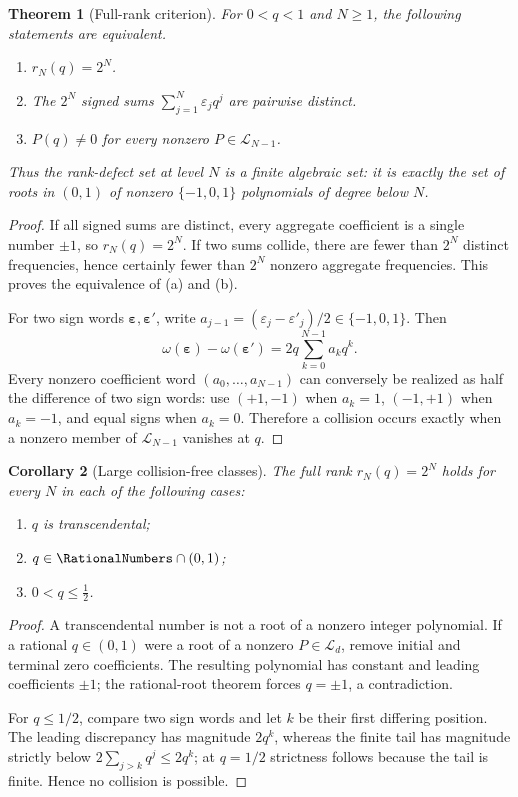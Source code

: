 \documentclass[11pt]{article}
\numberwithin{equation}{section}
\newtheorem{theorem}{Theorem}[section]
\newtheorem{corollary}[theorem]{Corollary}
\theoremstyle{definition}
\theoremstyle{remark}
\newcommand{\eps}{\varepsilon}
\begin{document}
\begin{theorem}[Full-rank criterion]
\label{thm:full-rank-criterion}
For $0<q<1$ and $N\ge1$, the following statements are equivalent.
\begin{enumerate}[label=(\alph*)]
 \item $r_N(q)=2^N$.
 \item The $2^N$ signed sums $\sum_{j=1}^{N}\eps_jq^j$ are pairwise distinct.
 \item $P(q)\ne0$ for every nonzero $P\in\mathscr L_{N-1}$.
\end{enumerate}
Thus the rank-defect set at level $N$ is a finite algebraic set: it is exactly
the set of roots in $(0,1)$ of nonzero $\{-1,0,1\}$ polynomials of degree below
$N$.
\end{theorem}
\begin{proof}
If all signed sums are distinct, every aggregate coefficient is a single number
$\pm1$, so $r_N(q)=2^N$.  If two sums collide, there are fewer than $2^N$
distinct frequencies, hence certainly fewer than $2^N$ nonzero aggregate
frequencies.  This proves the equivalence of (a) and (b).

For two sign words $\bm\eps,\bm\eps'$, write
$a_{j-1}=(\eps_j-\eps'_j)/2\in\{-1,0,1\}$.  Then
\begin{equation}
 \omega(\bm\eps)-\omega(\bm\eps')
 =2q\sum_{k=0}^{N-1}a_kq^k.
 \label{eq:collision-polynomial}
\end{equation}
Every nonzero coefficient word $(a_0,\ldots,a_{N-1})$ can conversely be
realized as half the difference of two sign words: use $(+1,-1)$ when
$a_k=1$, $(-1,+1)$ when $a_k=-1$, and equal signs when $a_k=0$.  Therefore a
collision occurs exactly when a nonzero member of $\mathscr L_{N-1}$ vanishes
at $q$.
\end{proof}

\begin{corollary}[Large collision-free classes]
\label{cor:collision-free-classes}
The full rank $r_N(q)=2^N$ holds for every $N$ in each of the following cases:
\begin{enumerate}[label=(\roman*)]
 \item $q$ is transcendental;
 \item $q\in\RationalNumbers\cap(0,1)$;
 \item $0<q\le\tfrac12$.
\end{enumerate}
\end{corollary}
\begin{proof}
A transcendental number is not a root of a nonzero integer polynomial.  If a
rational $q\in(0,1)$ were a root of a nonzero $P\in\mathscr L_d$, remove initial
and terminal zero coefficients.  The resulting polynomial has constant and
leading coefficients $\pm1$; the rational-root theorem forces $q=\pm1$, a
contradiction.

For $q\le1/2$, compare two sign words and let $k$ be their first differing
position.  The leading discrepancy has magnitude $2q^k$, whereas the finite
tail has magnitude strictly below
$2\sum_{j>k}q^j\le2q^k$; at $q=1/2$ strictness follows because the tail is
finite.  Hence no collision is possible.
\end{proof}
\end{document}
